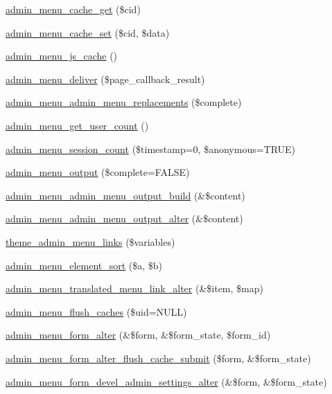 \begin{DoxyCompactItemize}
\hyperlink{admin__menu_8module_a7d23ea7a1845b08897ec01ce76e178a0}{admin\_\-menu\_\-cache\_\-get} (\$cid)
\item 
\hyperlink{admin__menu_8module_a77b0c61055add647432ae94d0693414d}{admin\_\-menu\_\-cache\_\-set} (\$cid, \$data)
\item 
\hyperlink{admin__menu_8module_a199e7fc41af069dbf54a2e229cfec72b}{admin\_\-menu\_\-js\_\-cache} ()
\item 
\hyperlink{admin__menu_8module_ab013e2c0ba08ba3bd0ea79bb9aa6518b}{admin\_\-menu\_\-deliver} (\$page\_\-callback\_\-result)
\item 
\hyperlink{admin__menu_8module_a5620a2879f671baacea4a3c84283fc6a}{admin\_\-menu\_\-admin\_\-menu\_\-replacements} (\$complete)
\item 
\hyperlink{admin__menu_8module_ad3786315404a78da596963267f80282f}{admin\_\-menu\_\-get\_\-user\_\-count} ()
\item 
\hyperlink{admin__menu_8module_a6fe5151c8d300535152c76edffcf6f5d}{admin\_\-menu\_\-session\_\-count} (\$timestamp=0, \$anonymous=TRUE)
\item 
\hyperlink{admin__menu_8module_a14e66c78d1c76de0b5265d4bdc111cb3}{admin\_\-menu\_\-output} (\$complete=FALSE)
\item 
\hyperlink{admin__menu_8module_a4a1a103aeff9901d8988a2aa5ba95571}{admin\_\-menu\_\-admin\_\-menu\_\-output\_\-build} (\&\$content)
\item 
\hyperlink{admin__menu_8module_a6bdd22955ce23f3772000dc38738a9cb}{admin\_\-menu\_\-admin\_\-menu\_\-output\_\-alter} (\&\$content)
\item 
\hyperlink{admin__menu_8module_a33d1120bbd0ebf32f21f44c17b831475}{theme\_\-admin\_\-menu\_\-links} (\$variables)
\item 
\hyperlink{admin__menu_8module_a5be948b66b1a9aad706773c536a3f7ac}{admin\_\-menu\_\-element\_\-sort} (\$a, \$b)
\item 
\hyperlink{admin__menu_8module_a6fe2d9b57846191f435845489259ddde}{admin\_\-menu\_\-translated\_\-menu\_\-link\_\-alter} (\&\$item, \$map)
\item 
\hyperlink{admin__menu_8module_a397aba2a3c508246b56d052faf29e9e4}{admin\_\-menu\_\-flush\_\-caches} (\$uid=NULL)
\item 
\hyperlink{admin__menu_8module_a04060c85de0ebbbe01c3d5cbed3091b6}{admin\_\-menu\_\-form\_\-alter} (\&\$form, \&\$form\_\-state, \$form\_\-id)
\item 
\hyperlink{admin__menu_8module_a0778640fb964053659420cc3cfbef413}{admin\_\-menu\_\-form\_\-alter\_\-flush\_\-cache\_\-submit} (\$form, \&\$form\_\-state)
\item 
\hyperlink{admin__menu_8module_a2626235c2e112a1f1afe3cb3bb5d926d}{admin\_\-menu\_\-form\_\-devel\_\-admin\_\-settings\_\-alter} (\&\$form, \&\$form\_\-state)
\end{DoxyCompactItemize}



